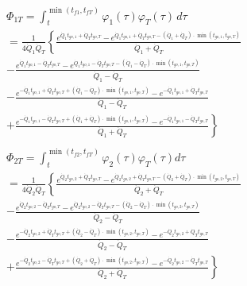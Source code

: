 \begin{equation}
\label{eq:36}
\begin{gathered}
  {\Phi _{1T}} = \int_t^{\min ({t_{f1}},{t_{fT}})} {{\varphi _1}} (\tau ){\varphi _T}(\tau )\,d\tau  \\ 
   = \frac{1}{{4{{\dot Q}_1}{{\dot Q}_T}}}\left\{ {\frac{{{e^{{{\dot Q}_1}{t_{go,1}} + {{\dot Q}_T}{t_{go,T}}}} - {e^{{{\dot Q}_1}{t_{go,1}} + {{\dot Q}_T}{t_{go,T}} - ({{\dot Q}_1} + {{\dot Q}_T}) \cdot \min ({t_{go,1}},{t_{go,T}})}}}}{{{{\dot Q}_1} + {{\dot Q}_T}}}} \right. \\ 
   - \frac{{{e^{{{\dot Q}_1}{t_{go,1}} - {{\dot Q}_T}{t_{go,T}}}} - {e^{{{\dot Q}_1}{t_{go,1}} - {{\dot Q}_T}{t_{go,T}} - ({{\dot Q}_1} - {{\dot Q}_T}) \cdot \min ({t_{go,1}},{t_{go,T}})}}}}{{{{\dot Q}_1} - {{\dot Q}_T}}} \\ 
   - \frac{{{e^{ - {{\dot Q}_1}{t_{go,1}} + {{\dot Q}_T}{t_{go,T}} + ({{\dot Q}_1} - {{\dot Q}_T}) \cdot \min ({t_{go,1}},{t_{go,T}})}} - {e^{ - {{\dot Q}_1}{t_{go,1}} + {{\dot Q}_T}{t_{go,T}}}}}}{{{{\dot Q}_1} - {{\dot Q}_T}}} \\ 
  \left. { + \frac{{{e^{ - {{\dot Q}_1}{t_{go,1}} - {{\dot Q}_T}{t_{go,T}} + ({{\dot Q}_1} + {{\dot Q}_T}) \cdot \min ({t_{go,1}},{t_{go,T}})}} - {e^{ - {{\dot Q}_1}{t_{go,1}} - {{\dot Q}_T}{t_{go,T}}}}}}{{{{\dot Q}_1} + {{\dot Q}_T}}}} \right\} \\ 
\end{gathered}
\end{equation}
\begin{equation}
\label{eq:37}
\begin{gathered}
  {\Phi _{2T}} = \int_t^{\min ({t_{f2}},{t_{fT}})} {{\varphi _2}} (\tau ){\varphi _T}(\tau )d\tau  \\ 
   = \frac{1}{{4{{\dot Q}_2}{{\dot Q}_T}}}\left\{ {\frac{{{e^{{{\dot Q}_2}{t_{go,2}} + {{\dot Q}_T}{t_{go,T}}}} - {e^{{{\dot Q}_2}{t_{go,2}} + {{\dot Q}_T}{t_{go,T}} - ({{\dot Q}_2} + {{\dot Q}_T}) \cdot \min ({t_{go,2}},{t_{go,T}})}}}}{{{{\dot Q}_2} + {{\dot Q}_T}}}} \right. \\ 
   - \frac{{{e^{{{\dot Q}_2}{t_{go,2}} - {{\dot Q}_T}{t_{go,T}}}} - {e^{{{\dot Q}_2}{t_{go,2}} - {{\dot Q}_T}{t_{go,T}} - ({{\dot Q}_2} - {{\dot Q}_T}) \cdot \min ({t_{go,2}},{t_{go,T}})}}}}{{{{\dot Q}_2} - {{\dot Q}_T}}} \\ 
   - \frac{{{e^{ - {{\dot Q}_2}{t_{go,2}} + {{\dot Q}_T}{t_{go,T}} + ({{\dot Q}_2} - {{\dot Q}_T}) \cdot \min ({t_{go,2}},{t_{go,T}})}} - {e^{ - {{\dot Q}_2}{t_{go,2}} + {{\dot Q}_T}{t_{go,T}}}}}}{{{{\dot Q}_2} - {{\dot Q}_T}}} \\ 
  \left. { + \frac{{{e^{ - {{\dot Q}_2}{t_{go,2}} - {{\dot Q}_T}{t_{go,T}} + ({{\dot Q}_2} + {{\dot Q}_T}) \cdot \min ({t_{go,2}},{t_{go,T}})}} - {e^{ - {{\dot Q}_2}{t_{go,2}} - {{\dot Q}_T}{t_{go,T}}}}}}{{{{\dot Q}_2} + {{\dot Q}_T}}}} \right\} \\ 
\end{gathered}
\end{equation}
